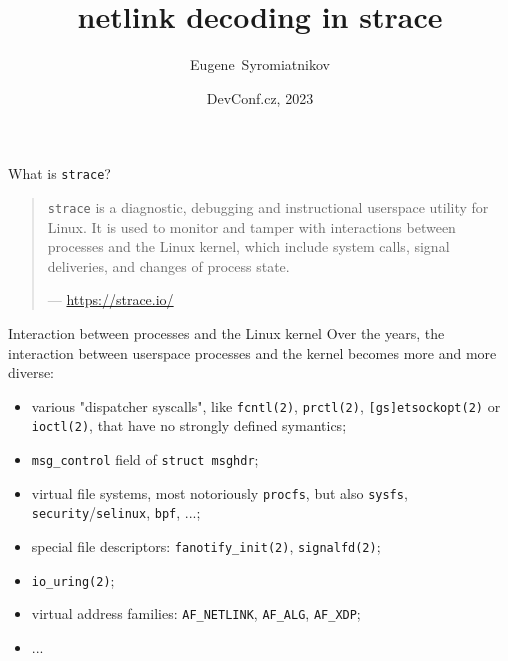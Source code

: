 \documentclass[unicode,aspectratio=169]{beamer}
\title{\Huge netlink decoding in strace}
\author{\Huge Eugene~Syromiatnikov}
\date{\Large DevConf.cz, 2023}
\begin{document}
{
\begin{frame}[noframenumbering]
\titlepage
\end{frame}
}

\begin{frame}{What is \texttt{strace}?}
\begin{quote}
\texttt{strace} is a diagnostic, debugging and instructional userspace
utility for Linux.
It is used to monitor and tamper with interactions between processes
and the Linux kernel, which include system calls, signal deliveries,
and changes of process state.

\begin{flushright}
— \url{https://strace.io/}
\end{flushright}
\end{quote}
\end{frame}

\begin{frame}{Interaction between processes and the Linux kernel}
Over the years, the interaction between userspace processes and the kernel becomes more and more diverse:
\begin{itemize}
  \item various "dispatcher syscalls", like \texttt{fcntl(2)}, \texttt{prctl(2)}, \texttt{[gs]etsockopt(2)} or \texttt{ioctl(2)}, that have no strongly defined symantics;
  \item \texttt{msg\_control} field of \texttt{struct msghdr};
  \item virtual file systems, most notoriously \texttt{procfs}, but also \texttt{sysfs}, \texttt{security}/\texttt{selinux}, \texttt{bpf}, ...;
  \item special file descriptors: \texttt{fanotify\_init(2)}, \texttt{signalfd(2)};
  \item \texttt{io\_uring(2)};
  \item virtual address families: \texttt{AF\_NETLINK}, \texttt{AF\_ALG}, \texttt{AF\_XDP};
  \item ...
\end{itemize}
\end{frame}
\end{document}
